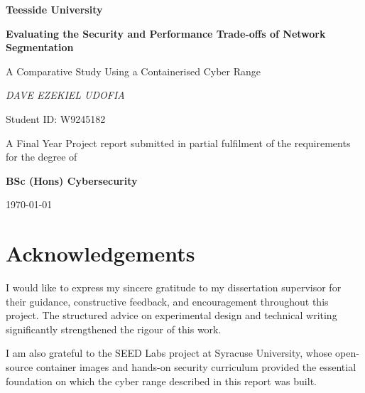 \documentclass[12pt,a4paper,oneside]{report}
\begin{document}
\begin{titlepage}
    \centering
    \vspace*{1.5cm}
    {\Large \textbf{Teesside University}\par}
    \vspace{0.5cm}

    {\Huge\bfseries Evaluating the Security and Performance Trade-offs of Network Segmentation\par}
    \vspace{0.5cm}
    {\Large A Comparative Study Using a Containerised Cyber Range\par}
    \vspace{2.5cm}

    {\Large\itshape DAVE EZEKIEL UDOFIA\par}
    \vspace{0.4cm}
    {\large Student ID: W9245182\par}
    \vspace{2cm}

    {\large A Final Year Project report submitted in partial fulfilment of the requirements for the degree of\par}
    \vspace{0.3cm}
    {\large\bfseries BSc (Hons) Cybersecurity\par}
    \vspace{1cm}
    {\large \today\par}
\end{titlepage}




\chapter*{Acknowledgements}
\thispagestyle{plain}

I would like to express my sincere gratitude to my dissertation supervisor for their guidance, constructive feedback, and encouragement throughout this project. The structured advice on experimental design and technical writing significantly strengthened the rigour of this work.

I am also grateful to the SEED Labs project at Syracuse University, whose open-source container images and hands-on security curriculum provided the essential foundation on which the cyber range described in this report was built.
\end{document}
